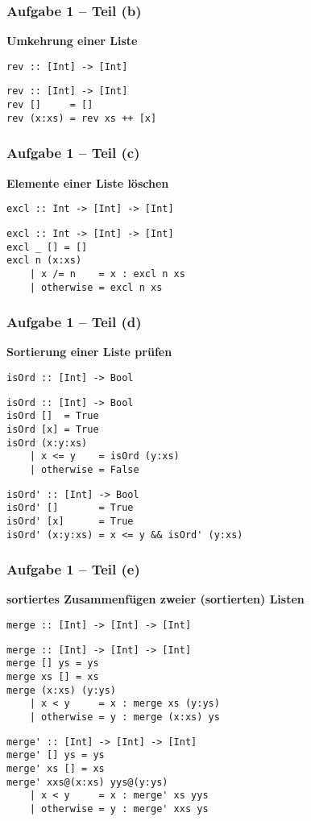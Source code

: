 \documentclass{beamer}
\begin{document}
\begin{frame}[t, fragile] \frametitle{Aufgabe 1 -- Teil (b)}
	\textbf{Umkehrung einer Liste}
	
	\texttt{rev :: [Int] -> [Int]}
	
	\pause \bigskip
	
	\begin{lstlisting}
rev :: [Int] -> [Int]
rev []     = []
rev (x:xs) = rev xs ++ [x]
	\end{lstlisting}
\end{frame}

\begin{frame}[t, fragile] \frametitle{Aufgabe 1 -- Teil (c)}
	\textbf{Elemente einer Liste löschen}
	
	\texttt{excl :: Int -> [Int] -> [Int]}
	
	\pause \bigskip
	
	\begin{lstlisting}
excl :: Int -> [Int] -> [Int]
excl _ [] = []
excl n (x:xs)
	| x /= n    = x : excl n xs
	| otherwise = excl n xs
	\end{lstlisting}
\end{frame}

\begin{frame}[t, fragile] \frametitle{Aufgabe 1 -- Teil (d)}
	\textbf{Sortierung einer Liste prüfen}
	
	\texttt{isOrd :: [Int] -> Bool}
	
	\pause \bigskip
	\begin{lstlisting}
isOrd :: [Int] -> Bool
isOrd []  = True
isOrd [x] = True
isOrd (x:y:xs)
	| x <= y    = isOrd (y:xs)
	| otherwise = False
	\end{lstlisting}
	\pause
	\begin{lstlisting}
isOrd' :: [Int] -> Bool
isOrd' []       = True
isOrd' [x]      = True
isOrd' (x:y:xs) = x <= y && isOrd' (y:xs)
	\end{lstlisting}
\end{frame}

\begin{frame}[t, fragile] \frametitle{Aufgabe 1 -- Teil (e)}
	\textbf{sortiertes Zusammenfügen zweier (sortierten) Listen}
	
	\texttt{merge :: [Int] -> [Int] -> [Int]}
	
	\pause \bigskip
	\begin{lstlisting}
merge :: [Int] -> [Int] -> [Int]
merge [] ys = ys
merge xs [] = xs
merge (x:xs) (y:ys)
	| x < y     = x : merge xs (y:ys)
	| otherwise = y : merge (x:xs) ys
	\end{lstlisting}
	\pause
	\begin{lstlisting}
merge' :: [Int] -> [Int] -> [Int]
merge' [] ys = ys
merge' xs [] = xs
merge' xxs@(x:xs) yys@(y:ys)
	| x < y     = x : merge' xs yys
	| otherwise = y : merge' xxs ys
	\end{lstlisting}
\end{frame}
\end{document}
